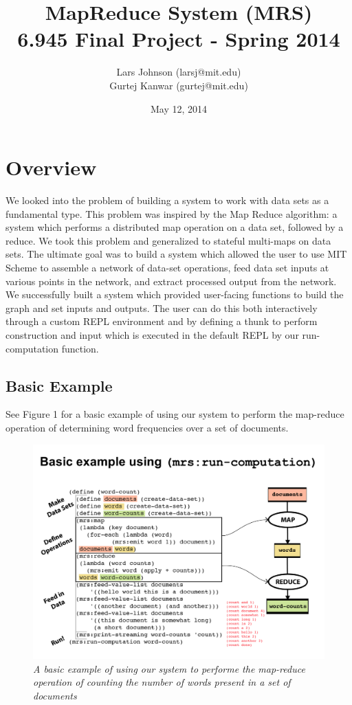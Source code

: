 \documentclass{article}
\title{MapReduce System (MRS)\\
{\large 6.945 Final Project - Spring 2014}}
\author{Lars Johnson (larsj@mit.edu) \\ Gurtej Kanwar (gurtej@mit.edu)}
\date{May 12, 2014}
\begin{document}
\pagestyle{myheadings}
\maketitle


\section{Overview}

We looked into the problem of building a system to work with data sets
as a fundamental type. This problem was inspired by the Map Reduce algorithm:
a system which performs a distributed map operation on a data set, followed
by a reduce. We took this problem and generalized to stateful multi-maps on data
sets. The ultimate goal was to build a system which allowed the user to
use MIT Scheme to assemble a network of data-set operations, feed data set
inputs at various points in the network, and extract processed output from
the network. We successfully built a system which provided user-facing functions
to build the graph and set inputs and outputs. The user can do this both interactively
through a custom REPL environment and by defining a thunk to perform construction
and input which is executed in the default REPL by our run-computation function.

\subsection{Basic Example}

See Figure 1 for a basic example of using our system to perform the
map-reduce operation of determining word frequencies over a set of documents.
\begin{figure}[h!]
  \includegraphics[width=\textwidth]{basic-example.png}
  \caption{\emph{\small A basic example of using our system to
      performe the map-reduce operation of counting the number of
      words present in a set of documents}}
\end{figure}
\end{document}
